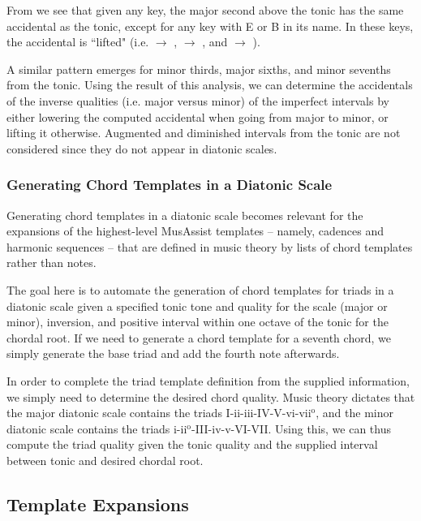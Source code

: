 \documentclass{article}
\begin{document}
From  we see that given any key, the major second above the tonic has the same accidental as the tonic, except for any key with E or B in its name. In these keys, the accidental is ``lifted"   (i.e. \musFlat $\rightarrow$ \musNatural, \musNatural $\rightarrow$ \musSharp, and \musSharp $\rightarrow$ \musDoubleSharp).

A similar pattern emerges for minor thirds, major sixths, and minor sevenths from the tonic. Using the result of this analysis, we can determine the accidentals of the inverse qualities (i.e. major versus minor) of the imperfect intervals by either lowering the computed accidental when going from major to minor, or lifting it otherwise. Augmented and diminished intervals from the tonic are not considered since they do not appear in diatonic scales.

\subsubsection{Generating Chord Templates in a Diatonic Scale}
\label{sec:chord_generate}
Generating chord templates in a diatonic scale becomes relevant for the expansions of the highest-level MusAssist templates – namely, cadences and harmonic sequences – that are defined in music theory by lists of chord templates rather than notes. 

The goal here is to automate the generation of chord templates for triads in a diatonic scale given a specified tonic tone and quality for the scale (major or minor), inversion, and positive interval within one octave of the tonic for the chordal root. If we need to generate a chord template for a seventh chord, we simply generate the base triad and add the fourth note afterwards. 

In order to complete the triad template definition from the supplied information, we simply need to determine the desired chord quality. Music theory dictates that the major diatonic scale contains the triads  I-ii-iii-IV-V-vi-vii$^\text{o}$, and the minor diatonic scale contains the triads i-ii$^\text{o}$-III-iv-v-VI-VII. Using this, we can thus compute the triad quality given the tonic quality and the supplied interval between tonic and desired chordal root.

\subsection{Template Expansions}
\end{document}

